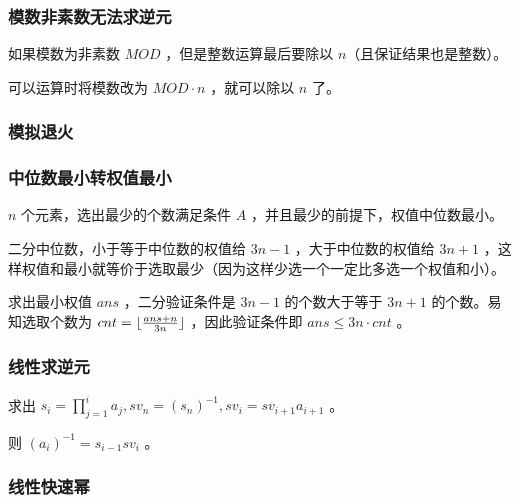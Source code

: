 

\subsubsection{模数非素数无法求逆元}

如果模数为非素数 $MOD$ ，但是整数运算最后要除以 $n$（且保证结果也是整数）。

可以运算时将模数改为 $MOD\cdot n$ ，就可以除以 $n$ 了。

\vspace{-0.3cm}

\subsubsection{模拟退火}

\vspace{-0.2cm}



\vspace{-0.4cm}

\subsubsection{中位数最小转权值最小}

$n$ 个元素，选出最少的个数满足条件 $A$ ，并且最少的前提下，权值中位数最小。

二分中位数，小于等于中位数的权值给 $3n-1$ ，大于中位数的权值给 $3n+1$ ，这样权值和最小就等价于选取最少（因为这样少选一个一定比多选一个权值和小）。

求出最小权值 $ans$ ，二分验证条件是 $3n-1$ 的个数大于等于 $3n+1$ 的个数。易知选取个数为 $cnt=\lfloor{ans+n\over 3n}\rfloor$ ，因此验证条件即 $ans\le 3n\cdot cnt$ 。

\vspace{-0.3cm}

\subsubsection{线性求逆元}

求出 $s_i=\prod_{j=1}^{i}a_j,sv_n=(s_n)^{-1},sv_{i}=sv_{i+1}a_{i+1}$ 。

则 $(a_i)^{-1}=s_{i-1}sv_i$ 。

\vspace{-0.3cm}

\subsubsection{线性快速幂}

